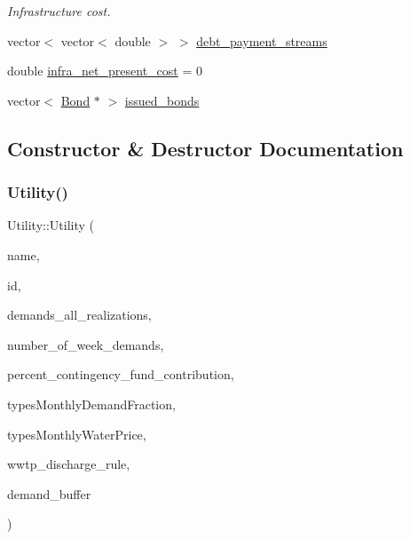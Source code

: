 \begin{DoxyCompactItemize}
\begin{DoxyCompactList}\small\item\em Infrastructure cost. \end{DoxyCompactList}\item 
vector$<$ vector$<$ double $>$ $>$ \mbox{\hyperlink{classUtility_aea06e0ef32e88d9eb34c2407d32bb42f_aea06e0ef32e88d9eb34c2407d32bb42f}{debt\+\_\+payment\+\_\+streams}}
\item 
double \mbox{\hyperlink{classUtility_a59d009825a96c734953f27edfa9e587e_a59d009825a96c734953f27edfa9e587e}{infra\+\_\+net\+\_\+present\+\_\+cost}} = 0
\item 
vector$<$ \mbox{\hyperlink{classBond}{Bond}} $\ast$ $>$ \mbox{\hyperlink{classUtility_ae100f50a95593230b2571bb746364186_ae100f50a95593230b2571bb746364186}{issued\+\_\+bonds}}
\end{DoxyCompactItemize}


\subsection{Constructor \& Destructor Documentation}
\mbox{\label{classUtility_adb0e1f43122886122d2437efbc5cd756_adb0e1f43122886122d2437efbc5cd756}} 
\subsubsection{\texorpdfstring{Utility()}{Utility()}\hspace{0.1cm}{\footnotesize\ttfamily [1/4]}}
{\footnotesize\ttfamily Utility\+::\+Utility (\begin{DoxyParamCaption}\item[{const char $\ast$}]{name,  }\item[{int}]{id,  }\item[{vector$<$ vector$<$ double $>$$>$ \&}]{demands\+\_\+all\+\_\+realizations,  }\item[{int}]{number\+\_\+of\+\_\+week\+\_\+demands,  }\item[{const double}]{percent\+\_\+contingency\+\_\+fund\+\_\+contribution,  }\item[{const vector$<$ vector$<$ double $>$$>$ \&}]{types\+Monthly\+Demand\+Fraction,  }\item[{const vector$<$ vector$<$ double $>$$>$ \&}]{types\+Monthly\+Water\+Price,  }\item[{\mbox{\hyperlink{classWwtpDischargeRule}{Wwtp\+Discharge\+Rule}}}]{wwtp\+\_\+discharge\+\_\+rule,  }\item[{double}]{demand\+\_\+buffer }\end{DoxyParamCaption})}

